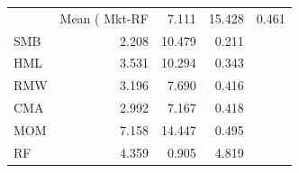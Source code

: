 \begin{tabular}{lrrr}
\toprule
 & Mean (%
\midrule
Mkt-RF & 7.111 & 15.428 & 0.461 \\
SMB & 2.208 & 10.479 & 0.211 \\
HML & 3.531 & 10.294 & 0.343 \\
RMW & 3.196 & 7.690 & 0.416 \\
CMA & 2.992 & 7.167 & 0.418 \\
MOM & 7.158 & 14.447 & 0.495 \\
RF & 4.359 & 0.905 & 4.819 \\
\bottomrule
\end{tabular}
